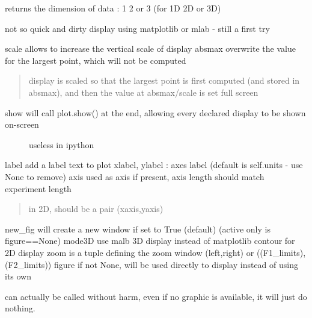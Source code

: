 \documentclass[letterpaper,10pt,openany,oneside]{sphinxmanual}
\begin{document}
\begin{fulllineitems}

\begin{fulllineitems}
\label{rst/code:NPKData.NPKData.dim}
returns the dimension of data : 1 2 or 3 (for 1D 2D or 3D)

\end{fulllineitems}


\begin{fulllineitems}
\label{rst/code:NPKData.NPKData.display}
not so quick and dirty display using matplotlib or mlab - still a first try

scale   allows to increase the vertical scale of display
absmax  overwrite the value for the largest point, which will not be computed
\begin{quote}

display is scaled so that the largest point is first computed (and stored in absmax),
and then the value at absmax/scale is set full screen
\end{quote}
\begin{description}
\item[{show    will call plot.show() at the end, allowing every declared display to be shown on-screen}] \leavevmode
useless in ipython

\end{description}

label   add a label text to plot
xlabel, ylabel : axes label (default is self.units - use None to remove)
axis    used as axis if present, axis length should match experiment length
\begin{quote}

in 2D, should be a pair (xaxis,yaxis)
\end{quote}

new\_fig will create a new window if set to True (default) (active only is figure==None)
mode3D  use malb 3D display instead of matplotlib contour for 2D display
zoom    is a tuple defining the zoom window (left,right) or   ((F1\_limits),(F2\_limits))
figure  if not None, will be used directly to display instead of using its own

can actually be called without harm, even if no graphic is available, it will just do nothing.


\end{fulllineitems}
\end{fulllineitems}
\end{document}
